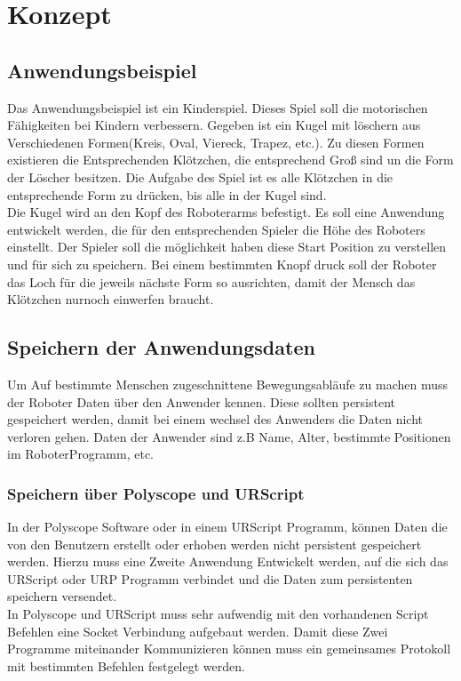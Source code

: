 \chapter{Konzept}
\label{konzept_kon}

\section{Anwendungsbeispiel}
\label{sec:anwendung_kon}

Das Anwendungsbeispiel ist ein Kinderspiel. Dieses Spiel soll die motorischen Fähigkeiten bei Kindern verbessern.
Gegeben ist ein Kugel mit löschern aus Verschiedenen Formen(Kreis, Oval, Viereck, Trapez, etc.). Zu diesen Formen existieren die Entsprechenden Klötzchen, die entsprechend Groß sind un die Form der Löscher besitzen. Die Aufgabe des Spiel ist es alle Klötzchen in die entsprechende Form zu drücken, bis alle in der Kugel sind.
\\
Die Kugel wird an den Kopf des Roboterarms befestigt. Es soll eine Anwendung entwickelt werden, die für den entsprechenden Spieler die Höhe des Roboters einstellt. Der Spieler soll die möglichkeit haben diese Start Position zu verstellen und für sich zu speichern. Bei einem bestimmten Knopf druck soll der Roboter das Loch für die jeweils nächste Form so ausrichten, damit der Mensch das Klötzchen nurnoch einwerfen braucht.

\section{Speichern der Anwendungsdaten}
\label{sec:save_of_data_kon}

Um Auf bestimmte Menschen zugeschnittene Bewegungsabläufe zu machen muss der Roboter Daten über den Anwender kennen. Diese sollten persistent gespeichert werden, damit bei einem wechsel des Anwenders die Daten nicht verloren gehen.
Daten der Anwender sind z.B Name, Alter, bestimmte Positionen im RoboterProgramm, etc.

\subsection{Speichern über Polyscope und URScript}
\label{sec:save_data_polyscope_kon}

In der Polyscope Software oder in einem URScript Programm, können Daten die von den Benutzern erstellt oder erhoben werden nicht persistent
gespeichert werden. Hierzu muss eine Zweite Anwendung Entwickelt werden, auf die sich das URScript oder URP Programm verbindet und die Daten zum persistenten speichern versendet.
\\
In Polyscope und URScript muss sehr aufwendig mit den vorhandenen Script Befehlen eine Socket Verbindung aufgebaut werden.
Damit diese Zwei Programme miteinander Kommunizieren können muss ein gemeinsames Protokoll mit bestimmten Befehlen festgelegt werden.

